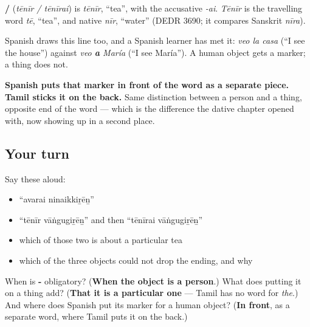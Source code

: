 \begin{cousinweb}
\textbf{ / } (\emph{tēnīr / tēnīrai}) is \emph{tēnīr}, \textquotedblleft{}tea\textquotedblright{}, with the accusative \emph{-ai}. \emph{Tēnīr} is the travelling word \emph{tē}, \textquotedblleft{}tea\textquotedblright{}, and native \emph{nīr}, \textquotedblleft{}water\textquotedblright{} (DEDR 3690; it compares Sanskrit \emph{nīra}).
\end{cousinweb}

\begin{tcolorbox}[breakable,skin=enhanced,colback=violet!6,colframe=violet!45!black,boxrule=0.5pt,arc=1mm,left=6pt,right=6pt,top=4pt,bottom=4pt,fonttitle=\bfseries,title={Across the family: the same line, drawn at the other end}]
Spanish draws this line too, and a Spanish learner has met it: \emph{veo la casa} (\textquotedblleft{}I see the house\textquotedblright{}) against \emph{veo \textbf{a} María} (\textquotedblleft{}I see María\textquotedblright{}). A human object gets a marker; a thing does not.

\textbf{Spanish puts that marker in front of the word as a separate piece. Tamil sticks it on the back.} Same distinction between a person and a thing, opposite end of the word — which is the difference the dative chapter opened with, now showing up in a second place.
\end{tcolorbox}

\subsection*{Your turn}
Say these aloud:

\begin{itemize}
\raggedright
  \item \textquotedblleft{}avarai ninaikkiṟēṉ\textquotedblright{}
  \item \textquotedblleft{}tēnīr vāṅgugiṟēṉ\textquotedblright{} and then \textquotedblleft{}tēnīrai vāṅgugiṟēṉ\textquotedblright{}
  \item which of those two is about a particular tea
  \item which of the three objects could not drop the ending, and why
\end{itemize}

\begin{tcolorbox}[breakable,colback=teal!4,colframe=teal!35!black,title={Before you move on}]
When is \textbf{-} obligatory? (\textbf{When the object is a person}.) What does putting it on a thing add? (\textbf{That it is a particular one} — Tamil has no word for \emph{the}.) And where does Spanish put its marker for a human object? (\textbf{In front}, as a separate word, where Tamil puts it on the back.)
\end{tcolorbox}
